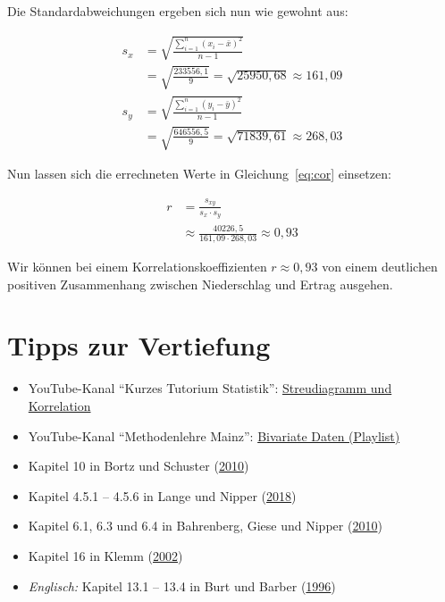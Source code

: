 \documentclass[
  11pt,
  ngerman,
  a4paper,
]{report}
\providecommand{\tightlist}{%
  \setlength{\itemsep}{0pt}\setlength{\parskip}{0pt}}
\begin{document}
Die Standardabweichungen ergeben sich nun wie gewohnt aus:

\[
\begin{aligned}
s_{x}&=\sqrt{\frac{\sum\limits^n_{i=1}(x_i-\bar{x})^2}{n-1}}\\
     &=\sqrt{\frac{233556{,}1}{9}}=\sqrt{25950{,}68}\approx161{,}09\\
s_{y}&=\sqrt{\frac{\sum\limits^n_{i=1}(y_i-\bar{y})^2}{n-1}}\\
     &=\sqrt{\frac{646556{,}5}{9}}=\sqrt{71839{,}61} \approx268{,}03
\end{aligned}
\]

Nun lassen sich die errechneten Werte in Gleichung~\eqref{eq:cor} einsetzen:

\[
\begin{aligned}
r&=\frac{s_{xy}}{s_x\cdot s_y}\\[4pt]
&\approx\frac{40226{,}5}{161{,}09\cdot268{,}03}\approx0{,}93
\end{aligned}
\]

Wir können bei einem Korrelationskoeffizienten \(r\approx0{,}93\) von einem deutlichen positiven Zusammenhang zwischen Niederschlag und Ertrag ausgehen.

\hypertarget{tipps-zur-vertiefung-6}{%
\section*{Tipps zur Vertiefung}\label{tipps-zur-vertiefung-6}}

\begin{itemize}
\tightlist
\item
  YouTube-Kanal \enquote{Kurzes Tutorium Statistik}: \href{https://www.youtube.com/watch?v=IwJ7RPIAxUo}{Streudiagramm und Korrelation}
\item
  YouTube-Kanal \enquote{Methodenlehre Mainz}: \href{https://www.youtube.com/playlist?list=PLJ-Cm_fyeZdwUkkeXkl2D1Czukhhl-9B2}{Bivariate Daten (Playlist)}
\item
  Kapitel 10 in Bortz und Schuster (\protect\hyperlink{ref-bortz}{2010})
\item
  Kapitel 4.5.1 -- 4.5.6 in Lange und Nipper (\protect\hyperlink{ref-delange}{2018})
\item
  Kapitel 6.1, 6.3 und 6.4 in Bahrenberg, Giese und Nipper (\protect\hyperlink{ref-bahrenberg}{2010})
\item
  Kapitel 16 in Klemm (\protect\hyperlink{ref-klemm}{2002})
\item
  \emph{Englisch:} Kapitel 13.1 -- 13.4 in Burt und Barber (\protect\hyperlink{ref-burt}{1996})
\end{itemize}
\end{document}
